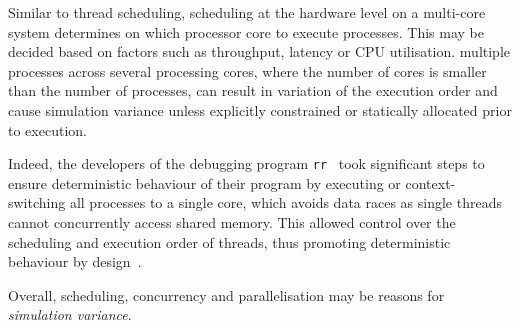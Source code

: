 Similar to thread scheduling, scheduling at the hardware level on a multi-core system determines on which processor core to execute processes. This may be decided based on factors such as throughput, latency or CPU utilisation. %
\DIFdelbegin {}\DIFdelend \DIFaddbegin {}\DIFaddend multiple processes across several processing cores, where the number of cores is smaller than the number of processes, \DIFaddbegin {}\DIFaddend can result in variation of the execution order and cause simulation variance unless explicitly constrained or statically allocated prior to execution. \DIFdelbegin %

\DIFdelend Indeed, the developers of the debugging program \texttt{rr}~\cite{RR_link} took significant steps to ensure deterministic behaviour of their program by executing or context-switching all processes to a single core, which avoids data races as single threads cannot concurrently access shared memory. This allowed control over the scheduling and execution order of threads, thus promoting deterministic behaviour by design~\cite{acm-q-rr-interview}.
\DIFdelbegin %

\DIFdelend 

Overall, scheduling, concurrency and parallelisation may be reasons for \textit{simulation variance}. 





\DIFaddbegin 

